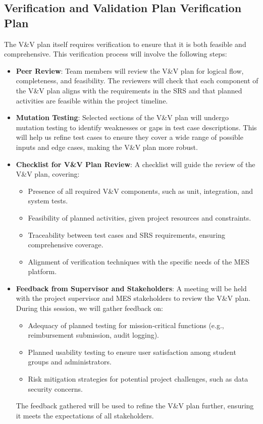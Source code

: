 \documentclass[12pt, titlepage]{article}
\begin{document}
\subsection{Verification and Validation Plan Verification Plan}
The V\&V plan itself requires verification to ensure that it is both feasible and comprehensive. This verification process will involve the following steps:

\begin{itemize}
    \item \textbf{Peer Review}: Team members will review the V\&V plan for logical flow, completeness, and feasibility. The reviewers will check that each component of the V\&V plan aligns with the requirements in the SRS and that planned activities are feasible within the project timeline.

    \item \textbf{Mutation Testing}: Selected sections of the V\&V plan will undergo mutation testing to identify weaknesses or gaps in test case descriptions. This will help us refine test cases to ensure they cover a wide range of possible inputs and edge cases, making the V\&V plan more robust.

    \item \textbf{Checklist for V\&V Plan Review}: A checklist will guide the review of the V\&V plan, covering:
    \begin{itemize}
        \item Presence of all required V\&V components, such as unit, integration, and system tests.
        \item Feasibility of planned activities, given project resources and constraints.
        \item Traceability between test cases and SRS requirements, ensuring comprehensive coverage.
        \item Alignment of verification techniques with the specific needs of the MES platform.
    \end{itemize}

    \item \textbf{Feedback from Supervisor and Stakeholders}: A meeting will be held with the project supervisor and MES stakeholders to review the V\&V plan. During this session, we will gather feedback on:
    \begin{itemize}
        \item Adequacy of planned testing for mission-critical functions (e.g., reimbursement submission, audit logging).
        \item Planned usability testing to ensure user satisfaction among student groups and administrators.
        \item Risk mitigation strategies for potential project challenges, such as data security concerns.
    \end{itemize}
    The feedback gathered will be used to refine the V\&V plan further, ensuring it meets the expectations of all stakeholders.
\end{itemize}
\end{document}
